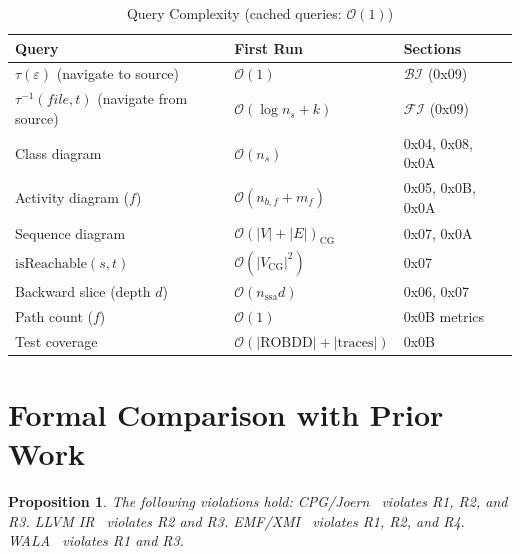 \documentclass[journal,10pt,twoside]{IEEEtran}
\newtheorem{proposition}[theorem]{Proposition}
\newcommand{\tauF}{\tau}
\newcommand{\tauI}{\tau^{-1}}
\newcommand{\FI}{\mathcal{FI}}
\newcommand{\BI}{\mathcal{BI}}
\newcommand{\ROBDD}{\mathrm{ROBDD}}
\newcommand{\BigO}{\mathcal{O}}
\begin{document}
\begin{table}[!t]
\renewcommand{\arraystretch}{1.2}
\caption{Query Complexity (cached queries: $\BigO(1)$)}
\label{tab:querycmplx}
\centering
\small
\begin{tabular}{@{}lll@{}}
\toprule
\textbf{Query} & \textbf{First Run}
  & \textbf{Sections}\\
\midrule
$\tauF(\varepsilon)$ (navigate to source)
  & $\BigO(1)$ & $\BI$ (0x09)\\
$\tauI(\mathit{file},t)$ (navigate from source)
  & $\BigO(\log n_s + k)$ & $\FI$ (0x09)\\
Class diagram
  & $\BigO(n_s)$ & 0x04, 0x08, 0x0A\\
Activity diagram ($f$)
  & $\BigO(n_{b,f}+m_f)$ & 0x05, 0x0B, 0x0A\\
Sequence diagram
  & $\BigO(|V|+|E|)_{\mathrm{CG}}$ & 0x07, 0x0A\\
$\mathrm{isReachable}(s,t)$
  & $\BigO(|V_{\mathrm{CG}}|^2)$ & 0x07\\
Backward slice (depth $d$)
  & $\BigO(n_{\mathrm{ssa}} d)$ & 0x06, 0x07\\
Path count ($f$)
  & $\BigO(1)$ & 0x0B metrics\\
Test coverage
  & $\BigO(|\ROBDD|+|\mathrm{traces}|)$ & 0x0B\\
\bottomrule
\end{tabular}
\end{table}

\section{Formal Comparison with Prior Work}\label{sec:comparison}

\begin{proposition}\label{prop:prior}
The following violations hold:
CPG/Joern~\cite{yamaguchi14} violates \emph{R1}, \emph{R2},
and \emph{R3}.
LLVM IR~\cite{lattner04} violates \emph{R2} and \emph{R3}.
EMF/XMI~\cite{emf} violates \emph{R1}, \emph{R2},
and \emph{R4}.
WALA~\cite{wala} violates \emph{R1} and \emph{R3}.
\end{proposition}
\end{document}
